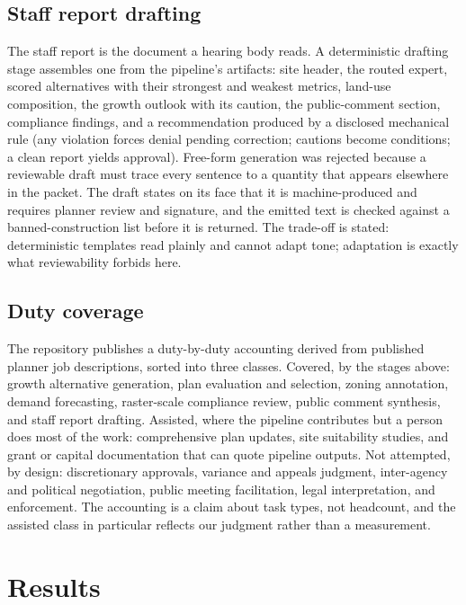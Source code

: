 \documentclass[11pt]{article}
\begin{document}
\subsection{Staff report drafting}
The staff report is the document a hearing body reads. A deterministic
drafting stage assembles one from the pipeline's artifacts: site
header, the routed expert, scored alternatives with their strongest
and weakest metrics, land-use composition, the growth outlook with its
caution, the public-comment section, compliance findings, and a
recommendation produced by a disclosed mechanical rule (any violation
forces denial pending correction; cautions become conditions; a clean
report yields approval). Free-form generation was rejected because a
reviewable draft must trace every sentence to a quantity that appears
elsewhere in the packet. The draft states on its face that it is
machine-produced and requires planner review and signature, and the
emitted text is checked against a banned-construction list before it
is returned. The trade-off is stated: deterministic templates read
plainly and cannot adapt tone; adaptation is exactly what reviewability
forbids here.

\subsection{Duty coverage}
\label{sec:coverage}
The repository publishes a duty-by-duty accounting derived from
published planner job descriptions, sorted into three classes.
Covered, by the stages above: growth alternative generation, plan
evaluation and selection, zoning annotation, demand forecasting,
raster-scale compliance review, public comment synthesis, and staff
report drafting. Assisted, where the pipeline contributes but a person
does most of the work: comprehensive plan updates, site suitability
studies, and grant or capital documentation that can quote pipeline
outputs. Not attempted, by design: discretionary approvals, variance
and appeals judgment, inter-agency and political negotiation, public
meeting facilitation, legal interpretation, and enforcement. The
accounting is a claim about task types, not headcount, and the
assisted class in particular reflects our judgment rather than a
measurement.

\section{Results}
\label{sec:results}
\end{document}
